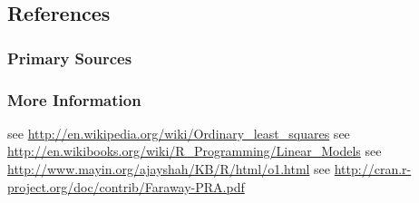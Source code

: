 




\subsection{References}

\subsubsection{Primary Sources}



\subsubsection{More Information}

see \url{http://en.wikipedia.org/wiki/Ordinary_least_squares}
see \url{http://en.wikibooks.org/wiki/R_Programming/Linear_Models}
see \url{http://www.mayin.org/ajayshah/KB/R/html/o1.html}
see \url{http://cran.r-project.org/doc/contrib/Faraway-PRA.pdf}

